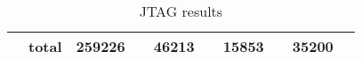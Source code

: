 \documentclass[10pt]{article}
\begin{document}
\begin{table}[H]
\begin{tabular}{ll rr rr rr rr}
    & total    
    & 259226 &                        
    & 46213 &                       
    & 15853 &                 
    & 35200 &                       
    \\
    \bottomrule
    \end{tabular}
    \caption{JTAG results}
    \label{tab:all-results}
  \end{table}

 
\end{document}
